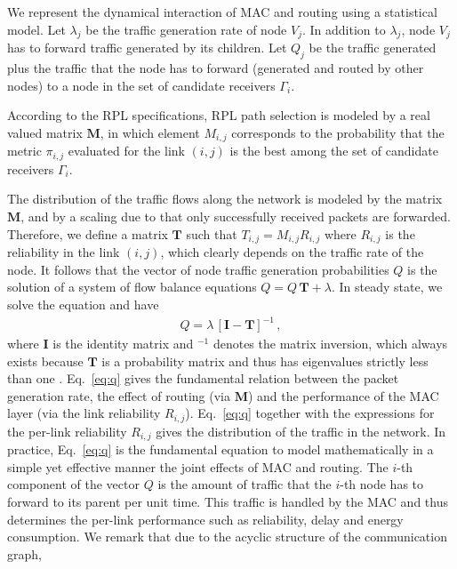 \documentclass[review, 1p, 11pt]{elsarticle}
\numberwithin{equation}{section}
\begin{document}
We represent the dynamical interaction of MAC and routing
using a statistical model.  Let $\lambda_j$ be the
traffic generation rate of node $V_j$. In addition to $\lambda_j$, node $V_j$ has to forward
traffic generated by its children.
Let $Q_j$ be the traffic generated plus the traffic that the node has to
forward (generated and routed by other nodes) to a node in the set of candidate receivers $\Gamma_i$.



According to the RPL specifications, RPL path selection is modeled by a real valued matrix
$\textbf{M}$, in which element $M_{i,j}$ corresponds to the
probability that the metric $\pi_{i,j}$ evaluated for the link $(i,j)$ is the
best among the set of candidate receivers $\Gamma_i$.




The distribution of the traffic flows along the network is modeled
by the matrix $\textbf{M}$, and by a scaling due to that only
successfully received packets are forwarded. Therefore, we define
a matrix $\textbf{T}$ such that $T_{i,j}= M_{i,j} R_{i,j}$ where
$R_{i,j}$ is the reliability in the link $(i,j)$, which clearly
depends on the traffic rate of the node. It follows that the vector
of node traffic generation probabilities $Q$ is the solution of a
system of flow balance equations $ Q = Q\, {\textbf{T}} +
\lambda$. In steady state, we solve the equation and have
\begin{align}\label{eq:q}
Q = \lambda\, [\textbf{I} - {\textbf{T}}]^{-1}  \,,
\end{align}
where \textbf{I} is the identity matrix and $^{-1}$ denotes the
matrix inversion, which always exists because $\textbf{T}$ is
a probability matrix and thus has eigenvalues strictly less than one \cite{matrix}. Eq.~\eqref{eq:q} gives the fundamental relation
between the packet generation rate, the effect of routing (via
$\textbf{M}$) and the performance of the MAC layer (via the link
reliability $R_{i,j}$). Eq.~\eqref{eq:q} together with the
expressions for the per-link reliability $R_{i,j}$ gives the distribution of the
traffic in the network. In practice, Eq.~\eqref{eq:q} is the
fundamental equation to model mathematically in a simple yet effective manner the joint effects of
MAC and routing. The $i$-th component of the vector $Q$ is the
amount of traffic that the $i$-th node has to forward to its parent per
unit time. This traffic is handled by the MAC and thus
determines the per-link performance such as reliability, delay
and energy consumption.
We remark that due to the acyclic structure of the communication graph,
\end{document}
